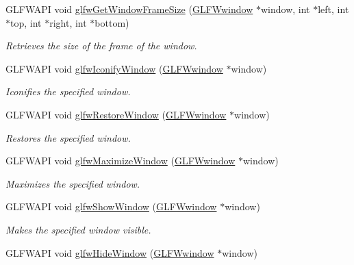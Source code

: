 \begin{CompactItemize}
GLFWAPI void \hyperlink{group__window_gad46cdaae2eb732f68d3a1499a7c5409}{glfwGetWindowFrameSize} (\hyperlink{group__window_g3c96d80d363e67d13a41b5d1821f3242}{GLFWwindow} $\ast$window, int $\ast$left, int $\ast$top, int $\ast$right, int $\ast$bottom)
\begin{CompactList}\small\item\em Retrieves the size of the frame of the window. \item\end{CompactList}\item 
GLFWAPI void \hyperlink{group__window_g24274e3c6ecd44e11fec5e6b66e4d7f3}{glfwIconifyWindow} (\hyperlink{group__window_g3c96d80d363e67d13a41b5d1821f3242}{GLFWwindow} $\ast$window)
\begin{CompactList}\small\item\em Iconifies the specified window. \item\end{CompactList}\item 
GLFWAPI void \hyperlink{group__window_g1e29caf0b819f578b04db52fff17256c}{glfwRestoreWindow} (\hyperlink{group__window_g3c96d80d363e67d13a41b5d1821f3242}{GLFWwindow} $\ast$window)
\begin{CompactList}\small\item\em Restores the specified window. \item\end{CompactList}\item 
GLFWAPI void \hyperlink{group__window_g4f825a55367d3fabde3d06e7f30128e8}{glfwMaximizeWindow} (\hyperlink{group__window_g3c96d80d363e67d13a41b5d1821f3242}{GLFWwindow} $\ast$window)
\begin{CompactList}\small\item\em Maximizes the specified window. \item\end{CompactList}\item 
GLFWAPI void \hyperlink{group__window_g7945bcdff9e5e058cf36505d6873ed8c}{glfwShowWindow} (\hyperlink{group__window_g3c96d80d363e67d13a41b5d1821f3242}{GLFWwindow} $\ast$window)
\begin{CompactList}\small\item\em Makes the specified window visible. \item\end{CompactList}\item 
GLFWAPI void \hyperlink{group__window_ga17e287d521544bdeceafa09ac036e20}{glfwHideWindow} (\hyperlink{group__window_g3c96d80d363e67d13a41b5d1821f3242}{GLFWwindow} $\ast$window)

\end{CompactItemize}
